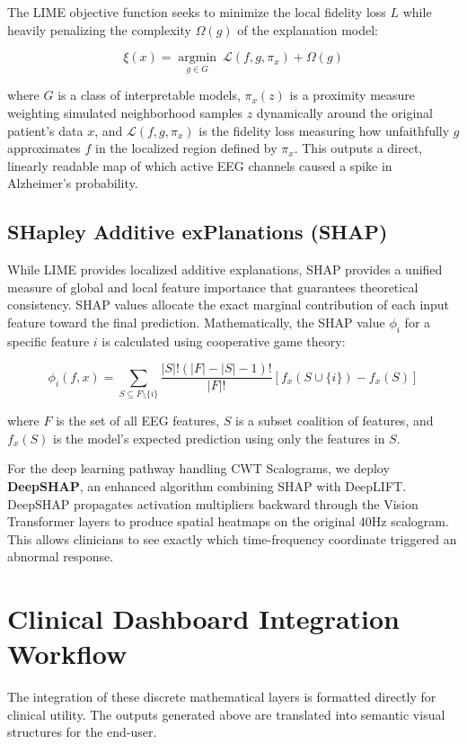 \documentclass[openany]{book}
\begin{document}
The LIME objective function seeks to minimize the local fidelity loss $L$ while heavily penalizing the complexity $\Omega(g)$ of the explanation model:

\begin{equation}
    \xi(x) = \underset{g \in G}{\operatorname{argmin}} \ \mathcal{L}(f, g, \pi_x) + \Omega(g)
\end{equation}

where $G$ is a class of interpretable models, $\pi_x(z)$ is a proximity measure weighting simulated neighborhood samples $z$ dynamically around the original patient's data $x$, and $\mathcal{L}(f, g, \pi_x)$ is the fidelity loss measuring how unfaithfully $g$ approximates $f$ in the localized region defined by $\pi_x$. This outputs a direct, linearly readable map of which active EEG channels caused a spike in Alzheimer's probability.

\subsection{SHapley Additive exPlanations (SHAP)}
\label{subsec:shap}
While LIME provides localized additive explanations, SHAP provides a unified measure of global and local feature importance that guarantees theoretical consistency. SHAP values allocate the exact marginal contribution of each input feature toward the final prediction. Mathematically, the SHAP value $\phi_i$ for a specific feature $i$ is calculated using cooperative game theory:

\begin{equation}
    \phi_i(f, x) = \sum_{S \subseteq F \setminus \{i\}} \frac{|S|! (|F| - |S| - 1)!}{|F|!} \left[ f_x(S \cup \{i\}) - f_x(S) \right]
\end{equation}

where $F$ is the set of all EEG features, $S$ is a subset coalition of features, and $f_x(S)$ is the model's expected prediction using only the features in $S$. 

For the deep learning pathway handling CWT Scalograms, we deploy \textbf{DeepSHAP}, an enhanced algorithm combining SHAP with DeepLIFT. DeepSHAP propagates activation multipliers backward through the Vision Transformer layers to produce spatial heatmaps on the original 40Hz scalogram. This allows clinicians to see exactly which time-frequency coordinate triggered an abnormal response.

\section{Clinical Dashboard Integration Workflow}
\label{sec:dashboard_integration}
The integration of these discrete mathematical layers is formatted directly for clinical utility. The outputs generated above are translated into semantic visual structures for the end-user.
\end{document}
